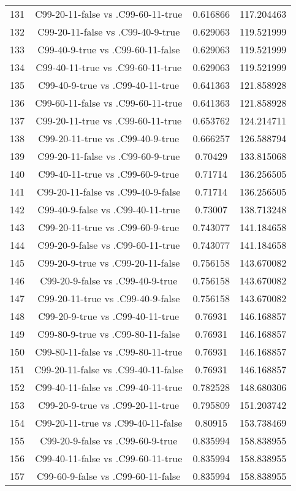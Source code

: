 \documentclass[a4paper,10pt]{article}
\begin{document}
\begin{landscape}
\begin{table}[!htp]
\begin{tabular}{cccc}
131&C99-20-11-false vs .C99-60-11-true&0.616866&117.204463\\
132&C99-20-11-false vs .C99-40-9-true&0.629063&119.521999\\
133&C99-40-9-true vs .C99-60-11-false&0.629063&119.521999\\
134&C99-40-11-true vs .C99-60-11-true&0.629063&119.521999\\
135&C99-40-9-true vs .C99-40-11-true&0.641363&121.858928\\
136&C99-60-11-false vs .C99-60-11-true&0.641363&121.858928\\
137&C99-20-11-true vs .C99-60-11-true&0.653762&124.214711\\
138&C99-20-11-true vs .C99-40-9-true&0.666257&126.588794\\
139&C99-20-11-false vs .C99-60-9-true&0.70429&133.815068\\
140&C99-40-11-true vs .C99-60-9-true&0.71714&136.256505\\
141&C99-20-11-false vs .C99-40-9-false&0.71714&136.256505\\
142&C99-40-9-false vs .C99-40-11-true&0.73007&138.713248\\
143&C99-20-11-true vs .C99-60-9-true&0.743077&141.184658\\
144&C99-20-9-false vs .C99-60-11-true&0.743077&141.184658\\
145&C99-20-9-true vs .C99-20-11-false&0.756158&143.670082\\
146&C99-20-9-false vs .C99-40-9-true&0.756158&143.670082\\
147&C99-20-11-true vs .C99-40-9-false&0.756158&143.670082\\
148&C99-20-9-true vs .C99-40-11-true&0.76931&146.168857\\
149&C99-80-9-true vs .C99-80-11-false&0.76931&146.168857\\
150&C99-80-11-false vs .C99-80-11-true&0.76931&146.168857\\
151&C99-20-11-false vs .C99-40-11-false&0.76931&146.168857\\
152&C99-40-11-false vs .C99-40-11-true&0.782528&148.680306\\
153&C99-20-9-true vs .C99-20-11-true&0.795809&151.203742\\
154&C99-20-11-true vs .C99-40-11-false&0.80915&153.738469\\
155&C99-20-9-false vs .C99-60-9-true&0.835994&158.838955\\
156&C99-40-11-false vs .C99-60-11-true&0.835994&158.838955\\
157&C99-60-9-false vs .C99-60-11-false&0.835994&158.838955\\

\end{tabular}
\end{table}
\end{landscape}
\end{document}
